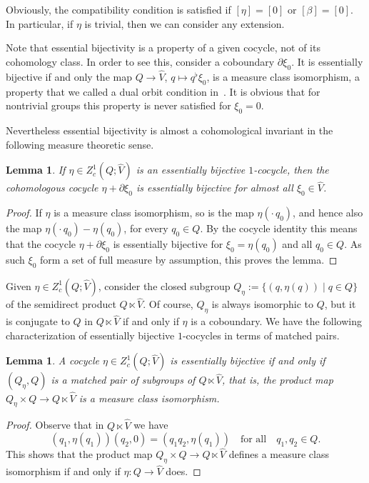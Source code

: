 \documentclass[a4paper,11pt,reqno]{amsart}
\numberwithin{equation}{section}
\newtheorem{lemma}[theorem]{Lemma}
\theoremstyle{remark}
\theoremstyle{definition}
\newcommand\bp{\begin{proof}}
\newcommand\ep{\end{proof}}
\begin{document}
Obviously, the compatibility condition is satisfied if $[\eta]=[0]$ or $[\beta]=[0]$. In particular, if $\eta$ is trivial, then we can consider any extension.

Note that essential bijectivity is a property of a given cocycle, not of its cohomology class. In order to see this, consider a coboundary $\partial\xi_0$. It is essentially bijective if and only the map $Q\to \hat V$, $q\mapsto q^\flat\xi_0$, is a measure class isomorphism, a property that we called a dual orbit condition in~\cite{BGNT3}. It is obvious that  for nontrivial groups this property is never satisfied for $\xi_0=0$.

Nevertheless essential bijectivity is almost a cohomological invariant in the following measure theoretic sense.

\begin{lemma}
If $\eta\in Z^1_c(Q;\hat V)$ is an essentially bijective $1$-cocycle, then the cohomologous cocycle $\eta+\partial\xi_0$ is essentially bijective for almost all $\xi_0\in\hat V$.
\end{lemma}

\bp
If $\eta$ is a measure class isomorphism, so is the map $\eta(\cdot\, q_0)$, and hence also the map $\eta(\cdot\,q_0)-\eta(q_0)$, for every $q_0\in Q$. By the cocycle identity this means that the cocycle $\eta+\partial\xi_0$ is essentially bijective for $\xi_0=\eta(q_0)$ and all $q_0\in Q$. As such $\xi_0$ form a set of full measure by assumption, this proves the lemma.
\ep

Given $\eta\in Z^1_c(Q;\hat V)$, consider the closed subgroup $Q_\eta:=\big\{(q,\eta(q))\mid q\in Q\}$ of the semidirect product $Q\ltimes\hat V$.
Of course, $Q_\eta$ is always isomorphic to $Q$, but it is conjugate to $Q$ in $Q\ltimes\hat V$ if and only if $\eta$ is a coboundary.
We have the following characterization of essentially bijective $1$-cocycles in terms of matched pairs.

\begin{lemma}\label{lem:matched}
A cocycle $\eta\in Z^1_c(Q;\hat V)$ is essentially bijective  if and only if $(Q_\eta,Q)$ is a matched pair of subgroups of $Q\ltimes\hat V$, that is, the product map
$Q_\eta\times Q\to Q\ltimes\hat V$ is a measure class isomorphism.
\end{lemma}

\begin{proof}
Observe that in  $Q\ltimes\hat V$ we have
$$
(q_1,\eta(q_1))(q_2,0)=(q_1q_2,\eta(q_1))\quad\text{for all}\quad q_1,q_2\in Q.
$$
This shows that the product map $Q_\eta\times Q\to Q\ltimes\hat V$ defines a measure class isomorphism if and only if $\eta\colon Q\to\hat V$ does.
\end{proof}
\end{document}

